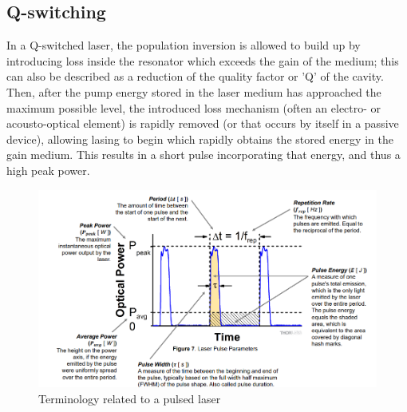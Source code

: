 \documentclass[%
 reprint,
 amsmath,amssymb,
 aps,
]{revtex4-2}
\begin{document}
	\subsection{Q-switching}
		In a Q-switched laser, the population inversion is allowed to build up by introducing loss inside the resonator which exceeds the gain of the medium; this can also be described as a reduction of the quality factor or 'Q' of the cavity. Then, after the pump energy stored in the laser medium has approached the maximum possible level, the introduced loss mechanism (often an electro- or acousto-optical element) is rapidly removed (or that occurs by itself in a passive device), allowing lasing to begin which rapidly obtains the stored energy in the gain medium. This results in a short pulse incorporating that energy, and thus a high peak power.
	\begin{figure}
		\includegraphics[scale = 0.41]{pulsedlaser}
		\caption{Terminology related to a pulsed laser}
	\end{figure}
\end{document}
